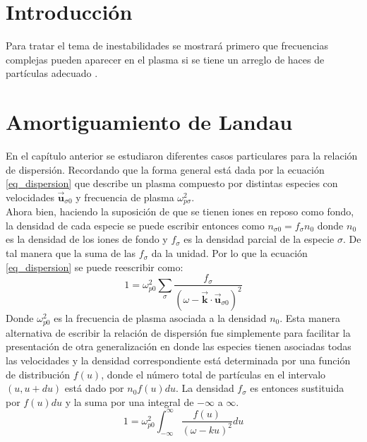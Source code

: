 \documentclass[../tesis_main_file.tex]{subfiles}
\begin{document}
\onlyinsubfile{\setcounter{chapter}{1}}
\section{Introducción}
Para tratar el tema de inestabilidades se mostrará primero que frecuencias complejas pueden aparecer en el plasma si se tiene un arreglo de haces de partículas adecuado \cite{bellan2008fundamentals}.
\section{Amortiguamiento de Landau}
En el capítulo anterior se estudiaron diferentes casos particulares para la relación de dispersión. Recordando que la forma general está dada por la ecuación \ref{eq_dispersion} que describe un plasma compuesto por distintas especies con velocidades $\overrightarrow{\textbf{u}}_{\sigma 0}$ y frecuencia de plasma $\omega^2_{p \sigma}$.\\
Ahora bien, haciendo la suposición de que se tienen iones en reposo como fondo, la densidad de cada especie se puede escribir entonces como $n_{\sigma 0} = f_{\sigma}n_0$ donde $n_0$ es la densidad de los iones de fondo y $f_{\sigma}$ es la densidad parcial de la especie $\sigma$. De tal manera que la suma de las $f_{\sigma}$ da la unidad. Por lo que la ecuación \ref{eq_dispersion} se puede reescribir como:
\begin{equation}
\label{eq:dispersion_general_1}
1 =\omega^2_{p0}\sum_{\sigma}\frac{f_{\sigma}}{(\omega - \overrightarrow{\textbf{k}}\cdot \overrightarrow{\textbf{u}}_{\sigma 0})^2}
\end{equation}
Donde $\omega^2_{p0}$ es la frecuencia de plasma asociada a la densidad $n_0$. Esta manera alternativa de escribir la relación de dispersión fue simplemente para facilitar la presentación de otra generalización en donde las especies tienen asociadas todas las velocidades y la densidad correspondiente está determinada por una función de distribución $f(u)$, donde el número total de partículas en el intervalo $(u,u+du)$ está dado por $n_0f(u)du$. La densidad $f_{\sigma}$ es entonces sustituida por $f(u)du$ y la suma por una integral de $-\infty$ a $\infty$.
\begin{equation}
\label{eq:dispersion_general_2}
1= \omega^2_{p0}\int^{\infty}_{-\infty}\frac{f(u)}{(\omega-k u)^2}du
\end{equation}
\end{document}
